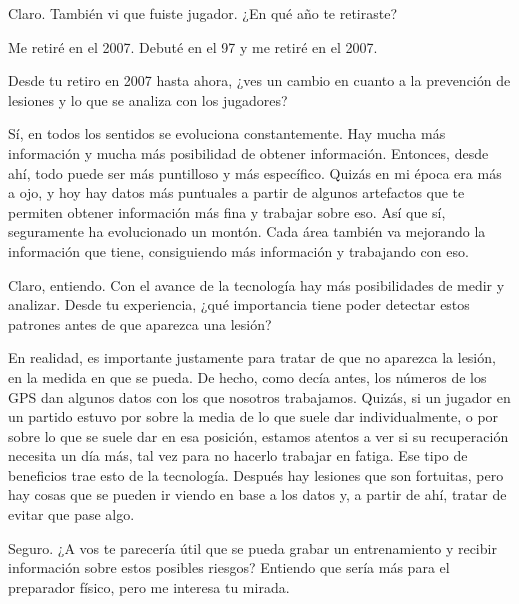 \begin{description}[leftmargin=0pt, itemindent=\parindent, labelsep=0.5em, itemsep=0pt, parsep=0pt, topsep=0pt]
    \item[\textbf{Entrevistador:}] Claro. También vi que fuiste jugador. ¿En qué año te retiraste?

    \item[\textbf{Leonardo Lemos:}] Me retiré en el 2007. Debuté en el 97 y me retiré en el 2007.

    \item[\textbf{Entrevistador:}] Desde tu retiro en 2007 hasta ahora, ¿ves un cambio en cuanto a la prevención de lesiones y lo que se analiza con los jugadores?

    \item[\textbf{Leonardo Lemos:}] Sí, en todos los sentidos se evoluciona constantemente. Hay mucha más información y mucha más posibilidad de obtener información. Entonces, desde ahí, todo puede ser más puntilloso y más específico. Quizás en mi época era más a ojo, y hoy hay datos más puntuales a partir de algunos artefactos que te permiten obtener información más fina y trabajar sobre eso. Así que sí, seguramente ha evolucionado un montón. Cada área también va mejorando la información que tiene, consiguiendo más información y trabajando con eso.

    \item[\textbf{Entrevistador:}] Claro, entiendo. Con el avance de la tecnología hay más posibilidades de medir y analizar. Desde tu experiencia, ¿qué importancia tiene poder detectar estos patrones antes de que aparezca una lesión?

    \item[\textbf{Leonardo Lemos:}] En realidad, es importante justamente para tratar de que no aparezca la lesión, en la medida en que se pueda. De hecho, como decía antes, los números de los GPS dan algunos datos con los que nosotros trabajamos. Quizás, si un jugador en un partido estuvo por sobre la media de lo que suele dar individualmente, o por sobre lo que se suele dar en esa posición, estamos atentos a ver si su recuperación necesita un día más, tal vez para no hacerlo trabajar en fatiga. Ese tipo de beneficios trae esto de la tecnología. Después hay lesiones que son fortuitas, pero hay cosas que se pueden ir viendo en base a los datos y, a partir de ahí, tratar de evitar que pase algo.

    \item[\textbf{Entrevistador:}] Seguro. ¿A vos te parecería útil que se pueda grabar un entrenamiento y recibir información sobre estos posibles riesgos? Entiendo que sería más para el preparador físico, pero me interesa tu mirada.


\end{description}
